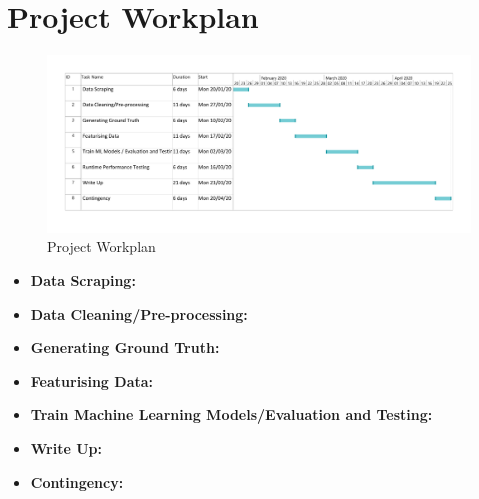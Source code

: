 \documentclass[]{UCD_CS_FYP_Report}
\begin{document}
\chapter{Project Workplan}
\begin{figure}[h]
    \centering
  \includegraphics[width=1\linewidth]{Figures/GanttChart.pdf}
  \caption{Project Workplan}
  \label{fig:Workplan}
\end{figure}

\begin{itemize}
    \item \textbf{Data Scraping: }
    \item \textbf{Data Cleaning/Pre-processing: }
    \item \textbf{Generating Ground Truth: }
    \item \textbf{Featurising Data: }
    \item \textbf{Train Machine Learning Models/Evaluation and Testing: }
    \item \textbf{Write Up: }
    \item \textbf{Contingency: }
\end{itemize}

\end{document}
